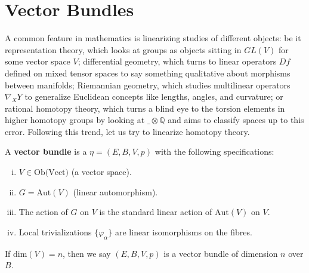\documentclass[11pt,a4paper]{article}
\begin{document}
\section*{Vector Bundles}
A common feature in mathematics is linearizing studies of different objects: be it representation theory, which looks at groups as objects sitting in $GL(V)$ for some vector space $V$; differential geometry, which turns to linear operators $Df$ defined on mixed tensor spaces to say something qualitative about morphisms between manifolds; Riemannian geometry, which studies multilinear operators $\nabla_XY$ to generalize Euclidean concepts like lengths, angles, and curvature; or rational homotopy theory, which turns a blind eye to the torsion elements in higher homotopy groups by looking at $\_\otimes\mathbb Q$ and aims to classify spaces up to this error.
Following this trend, let us try to linearize homotopy theory. \cite{atiyah2018k}

\begin{definition}
\label{def:vector-bundle}
A \textbf{vector bundle} is a  $\eta = (E, B, V, p)$ with the following specifications:
\begin{enumerate}[(i)]
    \item $V\in \text{Ob(Vect)}$ (a vector space).
    \item $G = \text{Aut}(V)$ (linear automorphism).
    \item The action of $G$ on $V$ is the standard linear action of $\text{Aut}(V)$ on $V$.
    \item Local trivializations $\{\varphi_{\alpha}\}$ are linear isomorphisms on the fibres.
\end{enumerate}

If $\text{dim}(V) = n$, then we say $(E, B, V, p)$ is a vector bundle of dimension $n$ over $B.$
\end{definition}

\end{document}
